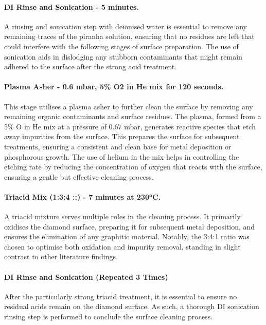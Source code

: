 \begin{refsection}
\paragraph{DI Rinse and Sonication - 5 minutes.}
A rinsing and sonication step with deionised water is essential to remove any remaining traces of the piranha solution, ensuring that no residues are left that could interfere with the following stages of surface preparation. The use of sonication aids in dislodging any stubborn contaminants that might remain adhered to the surface after the strong acid treatment.

\paragraph{Plasma Asher - 0.6 mbar, 5\% O2 in He mix for 120 seconds.}
This stage utilises a plasma asher to further clean the surface by removing any remaining organic contaminants and surface residues. The plasma, formed from a 5\% O in He mix at a pressure of 0.67 mbar, generates reactive species that etch away impurities from the surface. This prepares the surface for subsequent treatments, ensuring a consistent and clean base for metal deposition or phosphorous growth. The use of helium in the mix helps in controlling the etching rate by reducing the concentration of oxygen that reacts with the surface, ensuring a gentle but effective cleaning process.

\paragraph{Triacid Mix (1:3:4 ::) - 7 minutes at 230\si{\degreeCelsius}.}
A triacid mixture serves multiple roles in the cleaning process. It primarily oxidises the diamond surface, preparing it for subsequent metal deposition, and ensures the elimination of any graphitic material. Notably, the 3:4:1 ratio was chosen to optimise both oxidation and impurity removal, standing in slight contrast to other literature findings. 

\paragraph{DI Rinse and Sonication (Repeated 3 Times)}
After the particularly strong triacid treatment, it is essential to ensure no residual acids remain on the diamond surface. As such, a thorough DI sonication rinsing step is performed to conclude the surface cleaning process.


\end{refsection}
